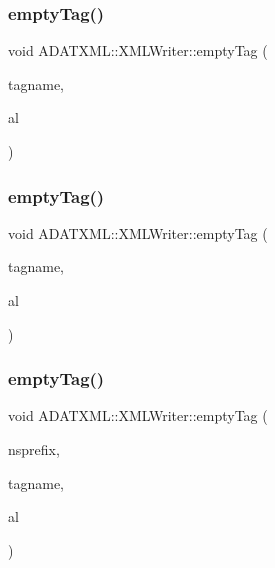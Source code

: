 \mbox{\label{classADATXML_1_1XMLWriter_a48c5adaca1b1c8126047c410c86644f3}} 
\subsubsection{\texorpdfstring{emptyTag()}{emptyTag()}\hspace{0.1cm}{\footnotesize\ttfamily [8/12]}}
{\footnotesize\ttfamily void A\+D\+A\+T\+X\+M\+L\+::\+X\+M\+L\+Writer\+::empty\+Tag (\begin{DoxyParamCaption}\item[{const std\+::string \&}]{tagname,  }\item[{\mbox{\hyperlink{namespaceXMLWriterAPI_a28cf3d8051a4ccf0aef208b7ebc66d07}{X\+M\+L\+Writer\+A\+P\+I\+::\+Attribute\+List}} \&}]{al }\end{DoxyParamCaption})}

\mbox{\label{classADATXML_1_1XMLWriter_a48c5adaca1b1c8126047c410c86644f3}} 
\subsubsection{\texorpdfstring{emptyTag()}{emptyTag()}\hspace{0.1cm}{\footnotesize\ttfamily [9/12]}}
{\footnotesize\ttfamily void A\+D\+A\+T\+X\+M\+L\+::\+X\+M\+L\+Writer\+::empty\+Tag (\begin{DoxyParamCaption}\item[{const std\+::string \&}]{tagname,  }\item[{\mbox{\hyperlink{namespaceXMLWriterAPI_a28cf3d8051a4ccf0aef208b7ebc66d07}{X\+M\+L\+Writer\+A\+P\+I\+::\+Attribute\+List}} \&}]{al }\end{DoxyParamCaption})}

\mbox{\label{classADATXML_1_1XMLWriter_a7b356346477d6f2e8e2d2db7553147dc}} 
\subsubsection{\texorpdfstring{emptyTag()}{emptyTag()}\hspace{0.1cm}{\footnotesize\ttfamily [10/12]}}
{\footnotesize\ttfamily void A\+D\+A\+T\+X\+M\+L\+::\+X\+M\+L\+Writer\+::empty\+Tag (\begin{DoxyParamCaption}\item[{const std\+::string \&}]{nsprefix,  }\item[{const std\+::string \&}]{tagname,  }\item[{\mbox{\hyperlink{namespaceXMLWriterAPI_a28cf3d8051a4ccf0aef208b7ebc66d07}{X\+M\+L\+Writer\+A\+P\+I\+::\+Attribute\+List}} \&}]{al }\end{DoxyParamCaption})}

